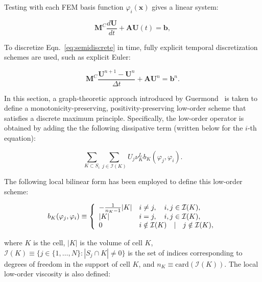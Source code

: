 Testing with each FEM basis function $\varphi_i(\mathbf{x})$ gives a linear system:

\begin{equation}\label{eq:semidiscrete}
      \mathbf{M}^C\frac{d\mathbf{U}}{dt}+\mathbf{A} \mathbf{U}(t) = \mathbf{b},
\end{equation}

To discretize Eqn.~\ref{eq:semidiscrete} in time, fully explicit
temporal discretization schemes are used, such as explicit Euler:

\begin{equation}\label{eq:exgalerkin}
   \mathbf{M}^C\frac{\mathbf{U}^{n+1}-\mathbf{U}^n}{\Delta t}
     + \mathbf{A}\mathbf{U}^n = \mathbf{b}^n.
\end{equation}

In this section, a graph-theoretic approach introduced by Guermond~\cite{guermond_firstorder}
is taken to define a monotonicity-preserving, positivity-preserving low-order
scheme that satisfies a discrete maximum principle. Specifically, the low-order operator
is obtained by adding the the following dissipative term (written below for  the $i$-th equation):

\begin{equation}\label{eq:viscousform}
\sum_{K \subset S_i} \sum_{j\in \mathcal{I}(K)} U_j\nu_K^L b_K(\varphi_j,\varphi_i) .
\end{equation}

\noindent
The following local bilinear form has been employed to define this low-order scheme:

\begin{equation}\label{eq:bilinearform}
      b_K(\varphi_j, \varphi_i) \equiv \left\{\begin{array}{l l}
         -\frac{1}{n_K - 1}|K| & i\ne j, \quad i,j\in \mathcal{I}(K),\\
         |K|                   & i = j,  \quad i,j\in \mathcal{I}(K),\\
         0                     & i\notin\mathcal{I}(K) \quad | \quad j\notin\mathcal{I}(K),
      \end{array}\right.
\end{equation}

\noindent
where $K$ is the cell, $|K|$ is the volume of cell $K$, $\mathcal{I}(K)\equiv \{j\in\{1,\ldots,N\}: |S_j\cap K|\ne 0\}$
is the set of indices corresponding to degrees of freedom in
the support of cell $K$, and $n_K \equiv \mbox{card}(\mathcal{I}(K))$.
The local low-order viscosity is also defined:

